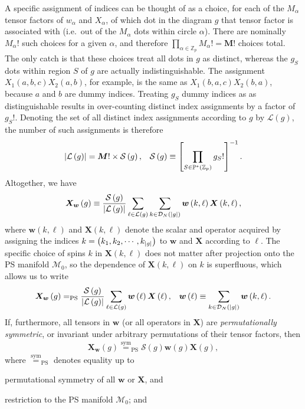 \documentclass[nofootinbib,notitlepage,11pt]{revtex4-2}
\renewcommand{\t}{\text} %
\newcommand{\f}[2]{\dfrac{#1}{#2}} %
\newcommand{\p}[1]{\left(#1\right)} %
\renewcommand{\sp}[1]{\left[#1\right]} %
\newcommand{\m}{\bm} %
\newcommand{\1}{\mathds{1}}
\newcommand{\D}{\mathcal{D}}
\renewcommand{\L}{\mathcal{L}}
\newcommand{\M}{\mathcal{M}}
\renewcommand{\S}{\mathcal{S}}
\newcommand{\PP}{\mathbb{P}}
\newcommand{\ZZ}{\mathbb{Z}}
\newcommand{\EQPS}{=_{\text{PS}}}
\begin{document}
A specific assignment of indices can be thought of as a choice, for
each of the $M_\alpha$ tensor factors of $w_\alpha$ and $X_\alpha$, of
which dot in the diagram $g$ that tensor factor is associated with
(i.e.~out of the $M_\alpha$ dots within circle $\alpha$).  There are
nominally $M_\alpha!$ such choices for a given $\alpha$, and therefore
$\prod_{\alpha\in\ZZ_p}M_\alpha!=\m M!$ choices total.  The only catch
is that these choices treat all dots in $g$ as distinct, whereas the
$g_S$ dots within region $S$ of $g$ are actually indistinguishable.
The assignment $X_1\p{a,b,c} X_2\p{a,b}$, for example, is the same as
$X_1\p{b,a,c} X_2\p{b,a}$, because $a$ and $b$ are dummy indices.
Treating $g_S$ dummy indices as as distinguishable results in
over-counting distinct index assignments by a factor of $g_S!$.
Denoting the set of all distinct index assignments according to $g$ by
$\L\p{g}$, the number of such assignments is therefore
\begin{align}
  \abs{\L\p{g}} = \m M! \times \S\p{g},
  &&
  \S\p{g} \equiv \sp{\prod_{S\in\PP^*\p{\ZZ_p}} g_S!}^{-1}.
  \label{eq:assignment_num}
\end{align}
Altogether, we have
\begin{align}
  \m X_{\m w}\p{g} \equiv \f{\S\p{g}}{\abs{\L\p{g}}}
  \sum_{\ell\in\L\p{g}} \sum_{k\in\D_N\p{\abs{g}}}
  \m w\p{k,\ell} \m X\p{k,\ell},
\end{align}
where $\m w\p{k,\ell}$ and $\m X\p{k,\ell}$ denote the scalar and
operator acquired by assigning the indices
$k=\p{k_1,k_2,\cdots,k_{\abs{g}}}$ to $\m w$ and $\m X$ according to
$\ell$.  The specific choice of spins $k$ in $\m X\p{k,\ell}$ does not
matter after projection onto the PS manifold $\M_0$, so the dependence
of $\m X\p{k,\ell}$ on $k$ is superfluous, which allows us to write
\begin{align}
  \m X_{\m w}\p{g}
  \EQPS \f{\S\p{g}}{\abs{\L\p{g}}} \sum_{\ell\in\L\p{g}}
  \m w\p{\ell} \m X\p{\ell},
  &&
  \m w\p{\ell} \equiv \sum_{k\in\D_N\p{\abs{g}}} \m w\p{k,\ell}.
  \label{eq:diagram_terms}
\end{align}
If, furthermore, all tensors in $\m w$ (or all operators in $\m X$)
are {\it permutationally symmetric}, or invariant under arbitrary
permutations of their tensor factors, then
\begin{align}
  \m X_{\m w}\p{g} \stackrel{\t{sym}}{=}_{\t{PS}}
  \S\p{g} \m w\p{g} \m X\p{g},
\end{align}
where $\stackrel{\t{sym}}{=}_{\t{PS}}$ denotes equality up to
\begin{enumerate*}
\item permutational symmetry of all $\m w$ or $\m X$, and
\item restriction to the PS manifold $\M_0$; and
\end{enumerate*}
\end{document}
